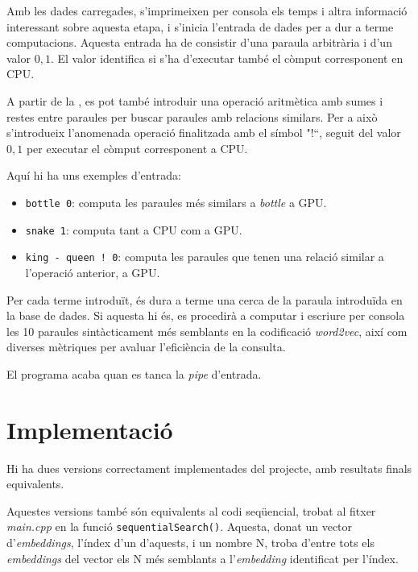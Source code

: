 \documentclass[catalan,10pt,a4paper]{article}
\begin{document}
Amb les dades carregades, s'imprimeixen per consola els temps i altra informació interessant sobre aquesta etapa, i s'inicia l'entrada de dades per a dur a terme computacions. \newline
Aquesta entrada ha de consistir d'una paraula arbitrària i d'un valor ${0,1}$. El valor identifica si s'ha d'executar també el còmput corresponent en CPU.

A partir de la , es pot també introduir una operació aritmètica amb sumes i restes entre paraules per buscar paraules amb relacions similars. Per a això s'introdueix l'anomenada operació finalitzada amb el símbol "!``, seguit del valor ${0,1}$ per executar el còmput corresponent a CPU.

Aquí hi ha uns exemples d'entrada:
\begin{itemize}
	\item \verb|bottle 0|: computa les paraules més similars a \textit{bottle} a GPU.
	\item \verb|snake 1|: computa tant a CPU com a GPU.
	\item \verb|king - queen ! 0|: computa les paraules que tenen una relació similar a l'operació anterior, a GPU.
\end{itemize}

Per cada terme introduït, és dura a terme una cerca de la paraula introduïda en la base de dades. Si aquesta hi és, es procedirà a computar i escriure per consola les 10 paraules sintàcticament més semblants en la codificació \textit{word2vec}, així com diverses mètriques per avaluar l'eficiència de la consulta.

El programa acaba quan es tanca la \textit{pipe} d'entrada.


\section*{Implementació}
Hi ha dues versions correctament implementades del projecte, amb resultats finals equivalents.

Aquestes versions també són equivalents al codi seqüencial, trobat al fitxer \textit{main.cpp} en la funció \verb|sequentialSearch()|. Aquesta, donat un vector d'\textit{embeddings}, l'índex d'un d'aquests, i un nombre N, troba d'entre tots els \textit{embeddings} del vector els N més semblants a l'\textit{embedding} identificat per l'índex.
\end{document}
